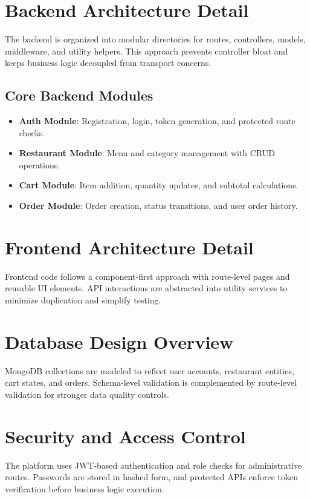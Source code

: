 \documentclass[12pt,a4paper]{report}
\begin{document}
\section{Backend Architecture Detail}
The backend is organized into modular directories for routes, controllers, models, middleware, and utility helpers. This approach prevents controller bloat and keeps business logic decoupled from transport concerns.

\subsection{Core Backend Modules}
\begin{itemize}
    \item \textbf{Auth Module}: Registration, login, token generation, and protected route checks.
    \item \textbf{Restaurant Module}: Menu and category management with CRUD operations.
    \item \textbf{Cart Module}: Item addition, quantity updates, and subtotal calculations.
    \item \textbf{Order Module}: Order creation, status transitions, and user order history.
\end{itemize}

\section{Frontend Architecture Detail}
Frontend code follows a component-first approach with route-level pages and reusable UI elements. API interactions are abstracted into utility services to minimize duplication and simplify testing.

\section{Database Design Overview}
MongoDB collections are modeled to reflect user accounts, restaurant entities, cart states, and orders. Schema-level validation is complemented by route-level validation for stronger data quality controls.

\section{Security and Access Control}
The platform uses JWT-based authentication and role checks for administrative routes. Passwords are stored in hashed form, and protected APIs enforce token verification before business logic execution.
\end{document}
